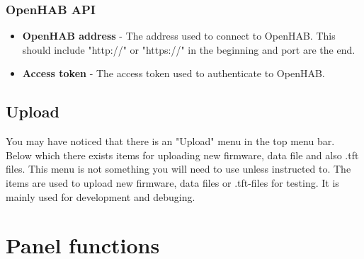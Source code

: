 \documentclass[10pt]{article}
\begin{document}
    \subsubsection{OpenHAB API}
    \begin{itemize}
      \item \textbf{OpenHAB address} - The address used to connect to OpenHAB. This should include "http://" or "https://" in the beginning and port are the end.
      \item \textbf{Access token} - The access token used to authenticate to OpenHAB.
    \end{itemize}

    \subsection{Upload}
    You may have noticed that there is an "Upload" menu in the top menu bar. Below which there exists items for uploading new firmware, data file and also .tft files. This menu is not something you
    will need to use unless instructed to. The items are used to upload new firmware, data files or .tft-files for testing. It is mainly used for development and debuging.

    \clearpage
    \section{Panel functions}
\end{document}
